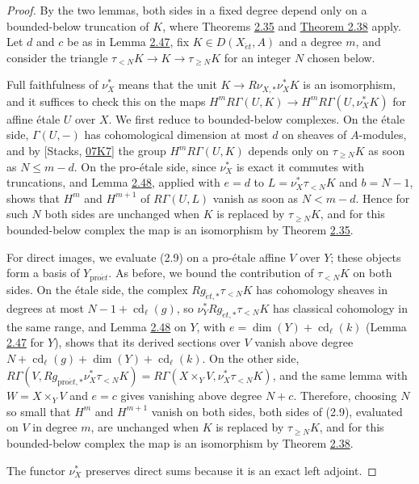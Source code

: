\documentclass[11pt]{article}
\begin{document}
\begin{proof}[{Proof}]\label{bp147}%
By the two lemmas, both sides in a fixed degree depend only on a bounded-below truncation of \(K\), where Theorems \hyperref[bp103]{2.35} and \hyperref[bp113]{Theorem 2.38} apply. Let \(d\) and \(c\) be as in Lemma \hyperref[bp142]{2.47}, fix \(K\in
D(X_{\acute{e}t},A)\) and a degree \(m\), and consider the triangle \(\tau_{<N}K\to K\to\tau_{\geq N}K\) for an integer \(N\) chosen below.

Full faithfulness of \(\nu_X^*\) means that the unit \(K\to R\nu_{X,*}\nu_X^*K\) is an isomorphism, and it suffices to check this on the maps \(H^mR\Gamma(U,K)\to H^mR\Gamma(U,\nu_X^*K)\) for affine étale \(U\) over \(X\). We first reduce to bounded-below complexes. On the étale side, \(\Gamma(U,-)\) has cohomological dimension at most \(d\) on sheaves of \(A\)-modules, and by [Stacks, \href{https://stacks.math.columbia.edu/tag/07K7}{07K7}] the group \(H^mR\Gamma(U,K)\) depends only on \(\tau_{\geq N}K\) as soon as \(N\leq m-d\). On the pro-étale side, since \(\nu_X^*\) is exact it commutes with truncations, and Lemma \hyperref[bp144]{2.48}, applied with \(e=d\) to \(L=\nu_X^*\tau_{<N}K\) and \(b=N-1\), shows that \(H^m\) and \(H^{m+1}\) of \(R\Gamma(U,L)\) vanish as soon as \(N<m-d\). Hence for such \(N\) both sides are unchanged when \(K\) is replaced by \(\tau_{\geq N}K\), and for this bounded-below complex the map is an isomorphism by Theorem \hyperref[bp103]{2.35}.

For direct images, we evaluate (2.9) on a pro-étale affine \(V\) over \(Y\); these objects form a basis of \(Y_{\mathrm{pro}\acute{e}t}\). As before, we bound the contribution of \(\tau_{<N}K\) on both sides. On the étale side, the complex \(Rg_{\acute{e}t,*}\tau_{<N}K\) has cohomology sheaves in degrees at most \(N-1+\operatorname{cd}_\ell(g)\), so \(\nu_Y^*Rg_{\acute{e}t,*}\tau_{<N}K\) has classical cohomology in the same range, and Lemma \hyperref[bp144]{2.48} on \(Y\), with \(e=\dim(Y)+\operatorname{cd}_\ell(k)\) (Lemma \hyperref[bp142]{2.47} for \(Y\)), shows that its derived sections over \(V\) vanish above degree \(N+\operatorname{cd}_\ell(g)+\dim(Y)+\operatorname{cd}_\ell(k)\). On the other side, \(R\Gamma(V,Rg_{\mathrm{pro}\acute{e}t,*}\nu_X^*\tau_{<N}K)=R\Gamma(X\times_YV,\nu_X^*\tau_{<N}K)\), and the same lemma with \(W=X\times_YV\) and \(e=c\) gives vanishing above degree \(N+c\). Therefore, choosing \(N\) so small that \(H^m\) and \(H^{m+1}\) vanish on both sides, both sides of (2.9), evaluated on \(V\) in degree \(m\), are unchanged when \(K\) is replaced by \(\tau_{\geq N}K\), and for this bounded-below complex the map is an isomorphism by Theorem \hyperref[bp113]{2.38}.

The functor \(\nu_X^*\) preserves direct sums because it is an exact left adjoint.
\end{proof}
\end{document}
